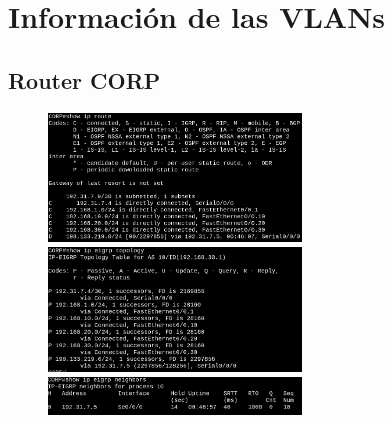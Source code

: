 \documentclass[letterpaper,12pt]{article}
\begin{document}
\begin{sloppypar}
\section{Información de las VLANs}
\subsection{Router CORP}
\begin{figure}[H]
    \centering 
    \includegraphics[width=0.6\textwidth]{router.png}
    \vspace{0.3cm}\\ 
    \includegraphics[width=0.6\textwidth]{rout2.png}
    \vspace{0.3cm}\\ 
    \includegraphics[width=0.6\textwidth]{rout3.png}
\end{figure}

\end{sloppypar}
\end{document}
